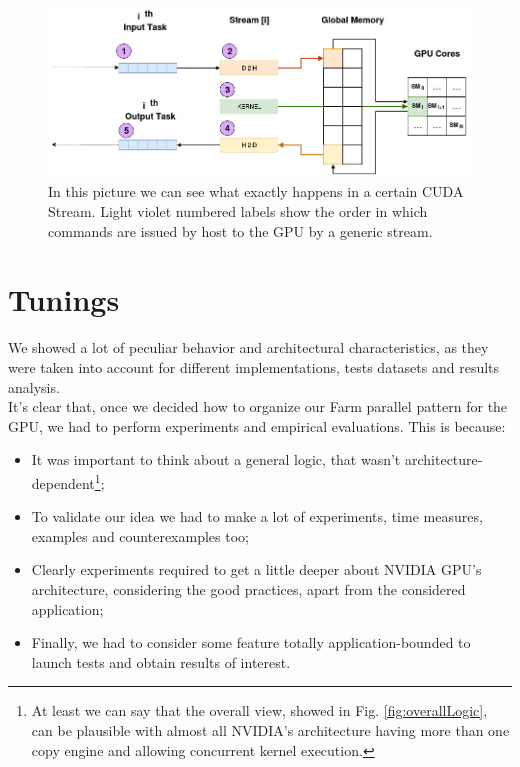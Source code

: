 	\begin{figure}%
			\hspace*{-0.5cm}  
		\includegraphics[scale=0.58]{images/singleTaskLogic.jpg}
		\caption{In this picture we can see what exactly happens in a certain CUDA Stream. Light violet numbered labels show the order in which commands are issued by host to the GPU by a generic stream.}
		\label{fig:singleStream}		
		
	\end{figure}	
\section{Tunings}
\label{sect:tunings}
	We showed a lot of peculiar behavior and architectural characteristics, as they were taken into account for different implementations, tests datasets and results analysis.\\
	It's clear that, once we decided how to organize our Farm parallel pattern for the GPU, we had to perform experiments and empirical evaluations.
	This is because:
	\begin{itemize}
		\item It was important to think about a general logic, that wasn't architecture-dependent\footnote{At least we can say that the overall view, showed in Fig. \ref{fig:overallLogic}, can be plausible with almost all NVIDIA's architecture having more than one copy engine and allowing concurrent kernel execution.};
		
		\item To validate our idea we had to make a lot of experiments, time measures, examples and counterexamples too;
		
		\item Clearly experiments required to get a little deeper about NVIDIA GPU's architecture, considering the good practices, apart from the considered application;
		
		\item Finally, we had to consider some feature totally application-bounded to launch tests and obtain results of interest.
	\end{itemize}
	
